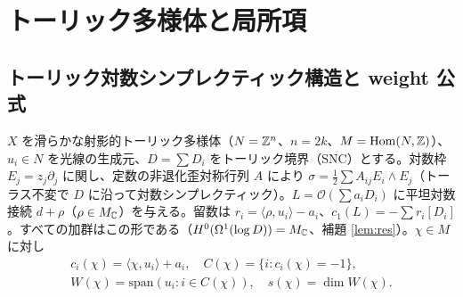 \section{トーリック多様体と局所項}\label{sec:toric}
\subsection{トーリック対数シンプレクティック構造と weight 公式}
$X$ を滑らかな射影的トーリック多様体（$N=\mathbb Z^n$、$n=2k$、$M=\mathrm{Hom}(N,\mathbb Z)$）、$u_i\in N$ を光線の生成元、$D=\sum D_i$ をトーリック境界（SNC）とする。対数枠 $E_j=z_j\partial_j$ に関し、定数の非退化歪対称行列 $A$ により $\sigma=\tfrac12\sum A_{ij}E_i\wedge E_j$（トーラス不変で $D$ に沿って対数シンプレクティック）。$L=\mathcal O(\sum a_iD_i)$ に平坦対数接続 $d+\rho$（$\rho\in M_\mathbb C$）を与える。留数は $r_i=\langle\rho,u_i\rangle-a_i$、$c_1(L)=-\sum r_i[D_i]$。すべての加群はこの形である（$H^0(\Omega^1(\log D))=M_\mathbb C$、補題 \ref{lem:res}）\tP。$\chi\in M$ に対し
\begin{gather*}c_i(\chi)=\langle\chi,u_i\rangle+a_i,\quad C(\chi)=\{i:c_i(\chi)=-1\},\\ W(\chi)=\mathrm{span}(u_i:i\in C(\chi)),\quad s(\chi)=\dim W(\chi).\end{gather*}

